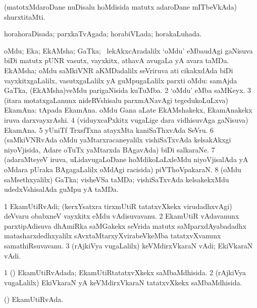 {{\bentry
{}
\gl{\nA}
\expl{}
\bmng
(matotxMdaroDane nuDisalu hoMdisida matutx adaroDane mITbeVkAda) shurxtitaMti. 
\emng
\eentry

\bentry
{} 
\gl{\gu}
\expl{}
\bmng
horahoraDisada; parxkaTvAgada; horabiVLada; horakaLuhada. 
\emng
\eentry

\bentry
{} 
\gl{\nA}
\expl{}
\bmng
\bnum
{} 
\banum
{} oMdu; Eka; EkAMsha; GaTka; \kanmu\ lekAkxcAradalilx `oMdu' eMbaudAgi gaNisuva biDi matutx pUNR vasutx, vayxkitx, athavA avugaLa yA avara taMDa. 
 EkAMsha; oMdu saMkiVNR aKMDadalilx seVriruva ati cikakxdAda biDi vayxkitxgaLalilx, vasutxgaLalilx yA guMpugaLalilx parxti oMdu:  samAjda GaTka, (EkAMsha)veMdu parigaNisida kuTuMba. 
\eanum
\numie
\num{2} `oMdu' eMba saMKeyx. 
\num{3} (itara motatxgaLanunx nideRVshisalu parxmANavAgi tegedukoLuLxva) EkamAna:  tApada EkamAna.  oMdu Gana aLate EkAMshakekx, EkamAnakekx iruva darxvayxrAshi. 
\num{4} (viduyxcaPxkitx \mo vugaLige dara vidhisuvAga gaNisuva) EkamAna. 
\num{5} yUniTf TrxsfTxna atayxMta kaniSaThxvAda SeVru. 
\num{6} (saMkiVNRvAda oMdu yaMtarxracaneyalilx vishiSaTxvAda kelsakAkxgi niyoVjisida, Adare oTuTx yaMtarxda BAgavAda) biDi salkaraNe. 
\num{7} (adaraMteyeV iruva, uLidavugaLoDane hoMdikoLaLxleMdu niyoVjisalAda yA oMdara pUraka BAgagaLalilx oMdAgi racisida) piVThoVpakaraN. 
\num{8} (oMdu saMsethxyalilx) GaTka; visheVSa taMDa; vishiSaTxvAda kelsakekxMdu udedxVshisalAda guMpu yA taMDa. 
\enum
\emng
\eentry

\bentry
{} 
\gl{\nA}
\expl{}
\bmng
\bnum
\num{1} EkamUtiRvAdi; (kerxYsatxra tirxmUtiR tatatxvXkekx virudadhxvAgi) deVvaru obabxneV vayxkitx eMdu vAdisuvavanu. 
\num{2} EkamUtiR vAdavanunx parxtipAdisuva dhAmiRka saMGakekx seVrida matutx saMparxdAyabadadhx matasharxdedhxyalilx sAvxtaMtarxyXvirabeVkeMba tatatxvXvanunx samathiRsuvavanu. 
\num{3} (rAjkiVya \mo vugaLalilx) keVMdirxVkaraN vAdi; EkiVkaraN vAdi. 
\enum
\emng
\eentry

\bentry
{} 
\gl{\gu}
\expl{}
\bmng
\bnum
\num{1} (\kerxY) EkamUtiRvAdada; EkamUtiRtatatxvXkekx saMbaMdhisida. 
\num{2} (rAjkiVya \mo vugaLalilx) EkiVkaraN yA keVMdirxVkaraN tatatxvXkekx saMbaMdhisida. 
\enum
\emng
\eentry

\bentry
{} 
\gl{\nA}
\expl{}
\bmng
(\kerxY) EkamUtiRvAda. 
\emng
\eentry

}}
